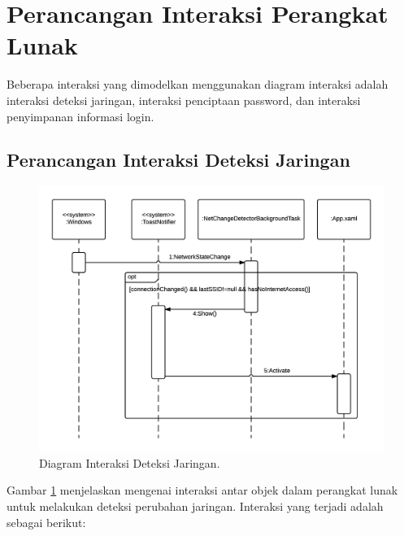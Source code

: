 \section{Perancangan Interaksi Perangkat Lunak}
\label{sec:perancangan_interaksi}

Beberapa interaksi yang dimodelkan menggunakan diagram interaksi adalah interaksi deteksi jaringan, interaksi penciptaan password, dan interaksi penyimpanan informasi login.

\subsection{Perancangan Interaksi Deteksi Jaringan}
\label{subsec:perancangan_interaksi_deteksi_jaringan}

\begin{figure}[!htb]
    \centering
    \includegraphics[scale=0.9]{Gambar/SequenceDiagramNetworkDetection.png}
    \caption[Diagram Interaksi Deteksi Jaringan.]{Diagram Interaksi Deteksi Jaringan.} 
    \label{fig:NetworkDetectionSequenceDiagram}
\end{figure}

Gambar \ref{fig:NetworkDetectionSequenceDiagram} menjelaskan mengenai interaksi antar objek dalam perangkat lunak untuk melakukan deteksi perubahan jaringan. Interaksi yang terjadi adalah sebagai berikut:


